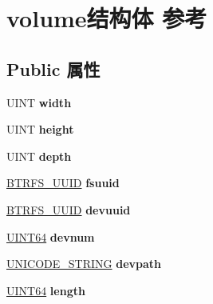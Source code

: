 \hypertarget{structvolume}{}\section{volume结构体 参考}
\label{structvolume}
\subsection*{Public 属性}
\begin{DoxyCompactItemize}
\item 
\mbox{\label{structvolume_a9efbab6523bdeba64e762ac660ac4e97}} 
U\+I\+NT {\bfseries width}
\item 
\mbox{\label{structvolume_a89274dbd7d80312ada6c4ef5f18d1cc1}} 
U\+I\+NT {\bfseries height}
\item 
\mbox{\label{structvolume_a47394757642719b20ac03891ea4a3ab4}} 
U\+I\+NT {\bfseries depth}
\item 
\mbox{\label{structvolume_a9baedf53245d389801685c0ff2c8e276}} 
\hyperlink{struct_b_t_r_f_s___u_u_i_d}{B\+T\+R\+F\+S\+\_\+\+U\+U\+ID} {\bfseries fsuuid}
\item 
\mbox{\label{structvolume_adc81d8cca1094e2b8a2fc1cb1fa1b6c9}} 
\hyperlink{struct_b_t_r_f_s___u_u_i_d}{B\+T\+R\+F\+S\+\_\+\+U\+U\+ID} {\bfseries devuuid}
\item 
\mbox{\label{structvolume_a99459b495c90cd268251a4925c1c8d3e}} 
\hyperlink{_processor_bind_8h_a57be03562867144161c1bfee95ca8f7c}{U\+I\+N\+T64} {\bfseries devnum}
\item 
\mbox{\label{structvolume_ac95211e3b2516d147da1fccb1b37b1b1}} 
\hyperlink{struct___u_n_i_c_o_d_e___s_t_r_i_n_g}{U\+N\+I\+C\+O\+D\+E\+\_\+\+S\+T\+R\+I\+NG} {\bfseries devpath}
\item 
\mbox{\label{structvolume_aaf89afb995cd84dbcd75a93aded176bf}} 
\hyperlink{_processor_bind_8h_a57be03562867144161c1bfee95ca8f7c}{U\+I\+N\+T64} {\bfseries length}
\item 
\mbox{\label{structvolume_acdb0d15821e4cd6f964b7199172be178}} 

\end{DoxyCompactItemize}
